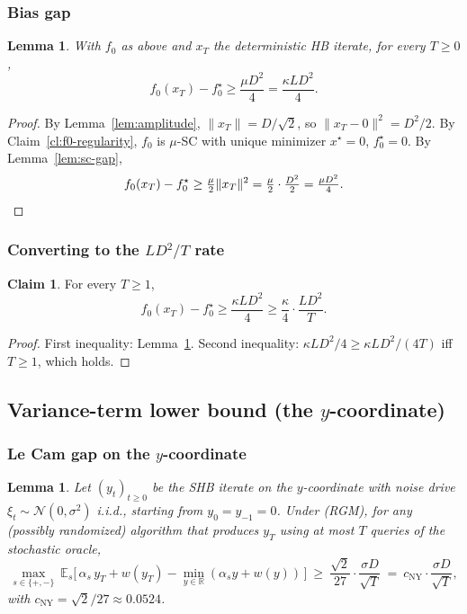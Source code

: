 \documentclass[11pt]{article}
\newtheorem{lemma}[theorem]{Lemma}
\theoremstyle{definition}
\newtheorem{claim}[theorem]{Claim}
\theoremstyle{remark}
\begin{document}
\subsubsection{Bias gap}

\begin{lemma}
\label{lem:bias-gap}
With $f_0$ as above and $x_T$ the deterministic HB iterate, for every $T \geq 0$,
\[
  f_0(x_T) - f_0^\star \geq \frac{\mu D^2}{4} = \frac{\kappa L D^2}{4}.
\]
\end{lemma}

\begin{proof}
By Lemma~\ref{lem:amplitude}, $\|x_T\| = D/\sqrt 2$, so $\|x_T - 0\|^2 = D^2/2$. By Claim~\ref{cl:f0-regularity}, $f_0$ is $\mu$-SC with unique minimizer $x^\star = 0$, $f_0^\star = 0$. By Lemma~\ref{lem:sc-gap},
\[
  f_0(x_T) - f_0^\star \geq \tfrac{\mu}{2}\|x_T\|^2 = \tfrac{\mu}{2}\cdot\tfrac{D^2}{2} = \tfrac{\mu D^2}{4}. \qedhere
\]
\end{proof}

\subsubsection{Converting to the \texorpdfstring{$LD^2/T$}{LD2/T} rate}

\begin{claim}
\label{cl:rate-conversion}
For every $T \geq 1$,
\[
  f_0(x_T) - f_0^\star \geq \frac{\kappa L D^2}{4} \geq \frac{\kappa}{4} \cdot \frac{L D^2}{T}.
\]
\end{claim}

\begin{proof}
First inequality: Lemma~\ref{lem:bias-gap}. Second inequality: $\kappa LD^2/4 \geq \kappa LD^2/(4T)$ iff $T \geq 1$, which holds.
\end{proof}

\subsection{Variance-term lower bound (the \texorpdfstring{$y$}{y}-coordinate)}

\subsubsection{Le Cam gap on the \texorpdfstring{$y$}{y}-coordinate}

\begin{lemma}
\label{lem:lecam-gap}
Let $(y_t)_{t \geq 0}$ be the SHB iterate on the $y$-coordinate with noise drive $\xi_t \sim \mathcal{N}(0, \sigma^2)$ i.i.d., starting from $y_0 = y_{-1} = 0$. Under (RGM), for any (possibly randomized) algorithm that produces $y_T$ using at most $T$ queries of the stochastic oracle,
\[
  \max_{s \in \{+,-\}}\ \mathbb{E}_s\big[\,\alpha_s\, y_T + w(y_T) - \min_{y \in \mathbb{R}}(\alpha_s y + w(y))\,\big]\ \geq\ \frac{\sqrt 2}{27}\cdot \frac{\sigma D}{\sqrt T}\ =\ c_{\mathrm{NY}}\cdot\frac{\sigma D}{\sqrt T},
\]
with $c_{\mathrm{NY}} = \sqrt 2/27 \approx 0.0524$.
\end{lemma}
\end{document}
